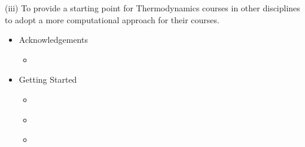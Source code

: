 \documentclass[letterpaper,10pt,english]{jupyterBook}
\begin{document}
\sphinxAtStartPar
(iii) To provide a starting point for Thermodynamics courses in other disciplines to adopt a more computational approach for their courses.
\begin{itemize}
\item {} 
\sphinxAtStartPar
Acknowledgements

\begin{itemize}
\item {} 
\sphinxAtStartPar
{\hyperref[\detokenize{notebooks/ack/ack::doc}]{}}

\end{itemize}
\end{itemize}
\begin{itemize}
\item {} 
\sphinxAtStartPar
Getting Started

\begin{itemize}
\item {} 
\sphinxAtStartPar
{\hyperref[\detokenize{notebooks/getting_started/getting_started::doc}]{}}

\item {} 
\sphinxAtStartPar
{\hyperref[\detokenize{notebooks/getting_started/basic_math::doc}]{}}

\item {} 
\sphinxAtStartPar
{\hyperref[\detokenize{notebooks/getting_started/Table_G1_Properties_of_ideal_gases::doc}]{}}

\end{itemize}
\end{itemize}
\end{document}
